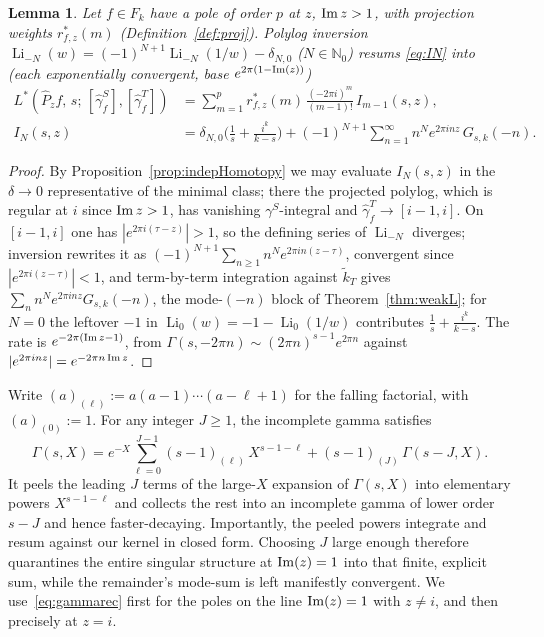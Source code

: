 \documentclass[11pt]{article}
\newtheorem{lemma}[theorem]{Lemma}
\newcommand{\NN}{\mathbb{N}}
\newcommand{\tk}{\widetilde{k}_T}
\DeclareMathOperator{\Li}{Li}
\begin{document}
\begin{lemma}\label{lem:polylogcf}
Let $f\in F_k$ have a pole of order $p$ at $z$, ${\rm Im}\,z>1$, with projection weights
$r^*_{f,z}(m)$ (Definition~\ref{def:proj}). Polylog inversion
$\Li_{-N}(w)=(-1)^{N+1}\Li_{-N}(1/w)-\delta_{N,0}$ ($N\in\NN_0$) resums \eqref{eq:IN} into
(each exponentially convergent, base $e^{2\pi(1-{\rm Im}(z))}$)
\begin{align}
L^*(\widehat P_z f,\,s;\,[\hat\gamma_f^S],[\hat\gamma_f^T])&=\sum_{m=1}^{p} r^*_{f,z}(m)\,\frac{(-2\pi i)^m}{(m-1)!}\,I_{m-1}(s,z),\label{eq:lem4.12.whole.z}\\
I_N(s,z)&=\delta_{N,0}\Big(\tfrac1s+\tfrac{i^k}{k-s}\Big)
+(-1)^{N+1}\sum_{n=1}^{\infty} n^N e^{2\pi inz}\,G_{s,k}(-n).
\end{align}
\end{lemma}

\begin{proof}
By Proposition~\ref{prop:indepHomotopy} we may evaluate $I_N(s,z)$ in the $\delta\to0$
representative of the minimal class; there the projected polylog, which is regular at $i$ since
${\rm Im}\,z>1$, has vanishing $\gamma^S$-integral and $\hat\gamma_f^T\to[i-1,i]$. On
$[i-1,i]$ one has $|e^{2\pi i(\tau-z)}|>1$, so the defining series of $\Li_{-N}$ diverges;
inversion rewrites it as $(-1)^{N+1}\sum_{n\ge1}n^Ne^{2\pi in(z-\tau)}$, convergent since
$|e^{2\pi i(z-\tau)}|<1$, and term-by-term integration against $\tk$ gives
$\sum_n n^N e^{2\pi inz}G_{s,k}(-n)$, the mode-$(-n)$ block of Theorem~\ref{thm:weakL}; for
$N=0$ the leftover $-1$ in $\Li_0(w)=-1-\Li_0(1/w)$ contributes $\tfrac1s+\tfrac{i^k}{k-s}$.
The rate is $e^{-2\pi({\rm Im}\,z-1)}$, from $\Gamma(s,-2\pi n)\sim(2\pi n)^{s-1}e^{2\pi n}$
against $|e^{2\pi inz}|=e^{-2\pi n\,{\rm Im}\,z}$.
\end{proof}

Write $(a)_{(\ell)}:=a(a-1)\cdots(a-\ell+1)$ for the falling factorial, with $(a)_{(0)}:=1$. For any
integer $J\ge1$, the incomplete gamma satisfies
\begin{equation}\label{eq:gammarec}
\Gamma(s,X)=e^{-X}\sum_{\ell=0}^{J-1}(s-1)_{(\ell)}\,X^{s-1-\ell}+(s-1)_{(J)}\,\Gamma(s-J,X).
\end{equation}
It peels the leading $J$ terms of the large-$X$ expansion of $\Gamma(s,X)$ into elementary powers
$X^{s-1-\ell}$ and collects the rest into an incomplete gamma of lower order $s-J$ and hence
faster-decaying. Importantly, the peeled powers integrate and resum against our kernel in closed
form. Choosing $J$ large enough therefore quarantines the entire singular structure at
${\rm Im}(z)=1$ into that finite, explicit sum, while the remainder's mode-sum is left manifestly
convergent. We use~\eqref{eq:gammarec} first for the poles on the line ${\rm Im}(z)=1$ with $z\neq i$,
and then precisely at $z=i$.
\end{document}
